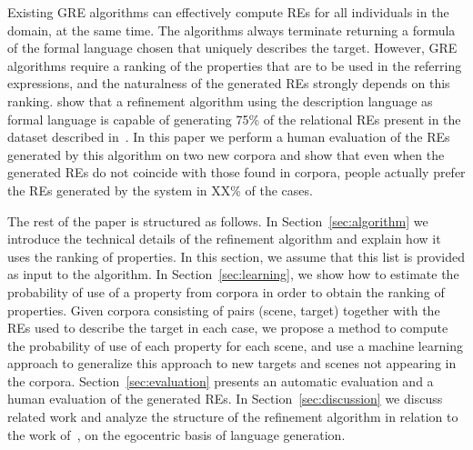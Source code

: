 Existing GRE algorithms can effectively compute REs for all individuals in the domain, at the same time. The algorithms always terminate returning a formula of the formal language chosen that uniquely describes the target. 
However, GRE algorithms require a ranking of the properties that are to be used in the referring expressions, and the naturalness of the generated REs strongly depends on this ranking. \cite{arec:2012:coling12} show that a refinement algorithm using the description language \el as formal language is capable of generating 75\% of the relational REs present in the dataset described in~\cite{viet:gene11}. In this paper we perform a human evaluation of the REs generated by this algorithm on two new corpora and show that even when the generated REs do not coincide with those found in corpora, people actually prefer the REs generated by the system in XX\% of the cases.  

The rest of the paper is structured as follows. In Section~\ref{sec:algorithm} we introduce the technical details of the 
refinement algorithm and explain how it uses the ranking of properties. In this section, we assume that this list is provided as 
input to the algorithm. In Section~\ref{sec:learning}, we show how to estimate the probability of use of a property from corpora in order to obtain the ranking of properties. Given corpora consisting of pairs (scene, target) together with the REs used to 
describe the target in each case, we propose a method to compute the probability of use of each property for each scene, and use a machine learning approach to generalize this approach to new targets and scenes not appearing in the corpora. Section~\ref{sec:evaluation} presents an automatic evaluation and a human evaluation of the generated REs. In Section~\ref{sec:discussion} we discuss related work and analyze the structure of the refinement algorithm in relation to the work of~\cite{keysar:Curr98}, on the egocentric basis of language generation. 

